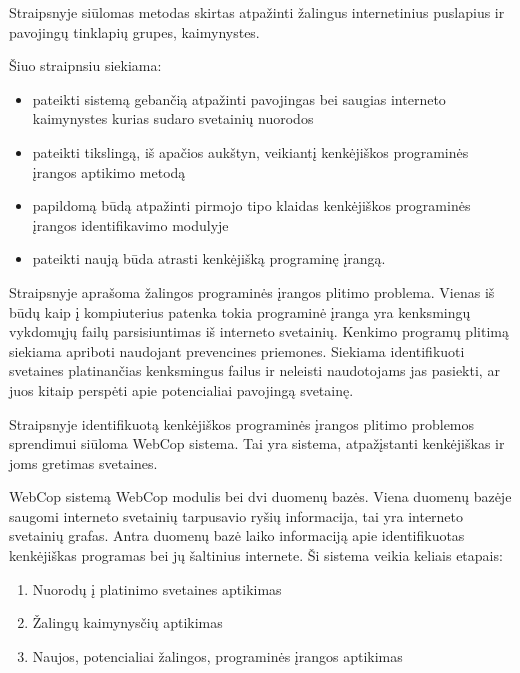 
Straipsnyje  siūlomas  metodas skirtas atpažinti žalingus internetinius puslapius ir
pavojingų tinklapių grupes, kaimynystes.

Šiuo straipnsiu siekiama:
    \begin{itemize}
        \item pateikti sistemą gebančią atpažinti pavojingas bei saugias interneto kaimynystes kurias sudaro svetainių nuorodos
         \item pateikti tikslingą, iš apačios aukštyn, veikiantį kenkėjiškos programinės įrangos aptikimo metodą
         \item papildomą būdą atpažinti pirmojo tipo klaidas kenkėjiškos programinės įrangos identifikavimo modulyje
         \item pateikti naują būda atrasti kenkėjišką programinę įrangą.
    \end{itemize}

Straipsnyje aprašoma žalingos programinės įrangos plitimo problema. Vienas iš būdų kaip į kompiuterius patenka  tokia
programinė įranga yra kenksmingų vykdomųjų failų parsisiuntimas iš interneto svetainių. Kenkimo programų plitimą siekiama
apriboti naudojant prevencines priemones. Siekiama identifikuoti svetaines platinančias kenksmingus failus ir neleisti
naudotojams jas pasiekti, ar juos kitaip perspėti apie potencialiai pavojingą svetainę.


Straipsnyje identifikuotą kenkėjiškos programinės įrangos plitimo problemos sprendimui siūloma WebCop sistema. Tai yra
sistema, atpažįstanti kenkėjiškas ir joms gretimas svetaines.

WebCop sistemą WebCop modulis bei dvi duomenų bazės. Viena duomenų bazėje saugomi interneto svetainių tarpusavio ryšių
informacija, tai yra interneto svetainių grafas. Antra duomenų bazė laiko informaciją apie identifikuotas kenkėjiškas
programas bei jų šaltinius internete. Ši sistema veikia keliais etapais:
    \begin{enumerate}[label=\arabic*.]
        \item Nuorodų į platinimo svetaines aptikimas
        \item Žalingų kaimynysčių aptikimas
        \item Naujos, potencialiai žalingos, programinės įrangos aptikimas
    \end{enumerate}


